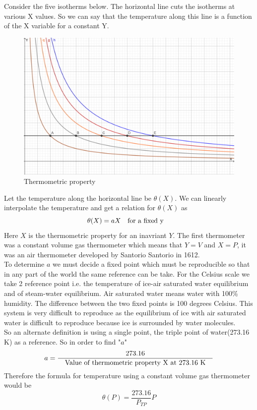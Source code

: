 \documentclass[12pt]{article}
\begin{document}
   Consider the five isotherms below. The horizontal line cuts the isotherms at various X values. So we can say that the temperature along this line is a function of the X variable for a constant Y.
   \begin{figure}[h]
   	\includegraphics[scale=1.3]{thermometric.png}
   	\centering
   	\caption{Thermometric property}
   \end{figure}
    
    Let the temperature along the horizontal line be $\theta(X)$. We can linearly interpolate the temperature and get a relation for $\theta(X)$ as
    \begin{equation}
    	\theta(X)=aX \qq{for a fixed y}
    \end{equation}
    Here $X$ is the thermometric property for an inavriant $Y$. The first thermometer was a constant volume gas thermometer which means that $Y=V$ and $X=P$, it was an air thermometer developed by Santorio Santorio in 1612. \\
    
    To determine $a$ we must decide a fixed point which must be reproducible so that in any part of the world the same reference can be take. For the Celsius scale we take 2 reference point i.e. the temperature of ice-air saturated water equilibrium and of steam-water equilibrium. Air saturated water means water with 100\% humidity. The difference between the two fixed points is 100 degrees Celsius. This system is very difficult to reproduce as the equilibrium of ice with air saturated water is difficult to reproduce because ice is surrounded by water molecules. \\
    
    So an alternate definition is using a single point, the triple point of water(273.16 K) as a reference. So in order to find "$a$" 
    \begin{equation}
    	a=\dfrac{273.16}{\qq{Value of thermometric property X at 273.16 K}}
    \end{equation}
    Therefore the formula for temperature using a constant volume gas thermometer would be
    \begin{equation*}
    	\theta(P)=\frac{273.16}{P_{TP}}P
    \end{equation*}
    
\end{document}
